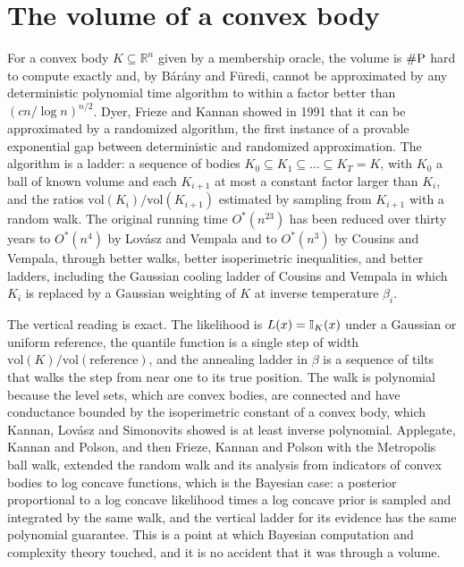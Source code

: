 \section{The volume of a convex body}

For a convex body $K \subseteq \mathbb{R}^n$ given by a membership oracle, the volume is $\#\mathrm{P}$ hard to compute exactly and, by B\'ar\'any and F\"uredi, cannot be approximated by any deterministic polynomial time algorithm to within a factor better than $(cn / \log n)^{n/2}$. Dyer, Frieze and Kannan showed in 1991 that it can be approximated by a randomized algorithm, the first instance of a provable exponential gap between deterministic and randomized approximation. The algorithm is a ladder: a sequence of bodies $K_0 \subseteq K_1 \subseteq \dots \subseteq K_T = K$, with $K_0$ a ball of known volume and each $K_{i+1}$ at most a constant factor larger than $K_i$, and the ratios $\mathrm{vol}(K_i) / \mathrm{vol}(K_{i+1})$ estimated by sampling from $K_{i+1}$ with a random walk. The original running time $O^*(n^{23})$ has been reduced over thirty years to $O^*(n^4)$ by Lov\'asz and Vempala and to $O^*(n^3)$ by Cousins and Vempala, through better walks, better isoperimetric inequalities, and better ladders, including the Gaussian cooling ladder of Cousins and Vempala in which $K_i$ is replaced by a Gaussian weighting of $K$ at inverse temperature $\beta_i$.

The vertical reading is exact. The likelihood is $L(x) = \mathbb{I}_K(x)$ under a Gaussian or uniform reference, the quantile function is a single step of width $\mathrm{vol}(K) / \mathrm{vol}(\text{reference})$, and the annealing ladder in $\beta$ is a sequence of tilts that walks the step from near one to its true position. The walk is polynomial because the level sets, which are convex bodies, are connected and have conductance bounded by the isoperimetric constant of a convex body, which Kannan, Lov\'asz and Simonovits showed is at least inverse polynomial. Applegate, Kannan and Polson, and then Frieze, Kannan and Polson with the Metropolis ball walk, extended the random walk and its analysis from indicators of convex bodies to log concave functions, which is the Bayesian case: a posterior proportional to a log concave likelihood times a log concave prior is sampled and integrated by the same walk, and the vertical ladder for its evidence has the same polynomial guarantee. This is a point at which Bayesian computation and complexity theory touched, and it is no accident that it was through a volume.

